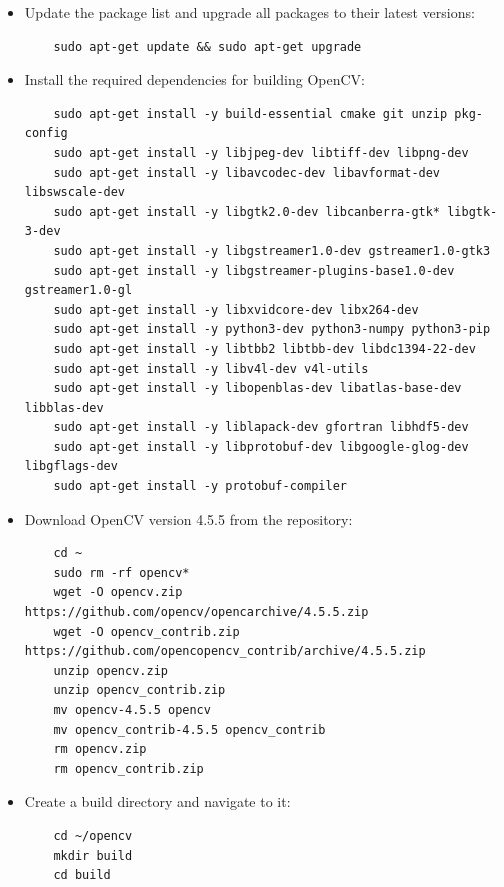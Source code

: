 \begin{itemize}
      \item Update the package list and upgrade all packages to their latest versions:

            \begin{lstlisting}
    sudo apt-get update && sudo apt-get upgrade
\end{lstlisting}

      \item Install the required dependencies for building OpenCV:

            \begin{lstlisting}
    sudo apt-get install -y build-essential cmake git unzip pkg-config
    sudo apt-get install -y libjpeg-dev libtiff-dev libpng-dev
    sudo apt-get install -y libavcodec-dev libavformat-dev libswscale-dev
    sudo apt-get install -y libgtk2.0-dev libcanberra-gtk* libgtk-3-dev
    sudo apt-get install -y libgstreamer1.0-dev gstreamer1.0-gtk3
    sudo apt-get install -y libgstreamer-plugins-base1.0-dev gstreamer1.0-gl
    sudo apt-get install -y libxvidcore-dev libx264-dev
    sudo apt-get install -y python3-dev python3-numpy python3-pip
    sudo apt-get install -y libtbb2 libtbb-dev libdc1394-22-dev
    sudo apt-get install -y libv4l-dev v4l-utils
    sudo apt-get install -y libopenblas-dev libatlas-base-dev libblas-dev
    sudo apt-get install -y liblapack-dev gfortran libhdf5-dev
    sudo apt-get install -y libprotobuf-dev libgoogle-glog-dev libgflags-dev
    sudo apt-get install -y protobuf-compiler
\end{lstlisting}

      \item Download OpenCV version 4.5.5 from the repository:

            \begin{lstlisting}
    cd ~ 
    sudo rm -rf opencv*
    wget -O opencv.zip https://github.com/opencv/opencarchive/4.5.5.zip 
    wget -O opencv_contrib.zip https://github.com/opencopencv_contrib/archive/4.5.5.zip 
    unzip opencv.zip 
    unzip opencv_contrib.zip 
    mv opencv-4.5.5 opencv
    mv opencv_contrib-4.5.5 opencv_contrib
    rm opencv.zip
    rm opencv_contrib.zip
\end{lstlisting}

      \item Create a build directory and navigate to it:

            \begin{lstlisting}
    cd ~/opencv
    mkdir build
    cd build
    \end{lstlisting}


\end{itemize}
